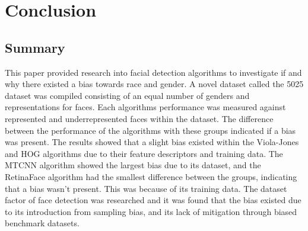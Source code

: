 \documentclass{l4proj}
\begin{document}
\chapter{Conclusion}

\section{Summary}
This paper provided research into facial detection algorithms to investigate if and why there existed a bias towards race and gender. A novel dataset called the 5025 dataset was compiled consisting of an equal number of genders and representations for faces. Each algorithms performance was measured against represented and underrepresented faces within the dataset. The difference between the performance of the algorithms with these groups indicated if a bias was present. The results showed that a slight bias existed within the Viola-Jones and HOG algorithms due to their feature descriptors and training data. The MTCNN algorithm showed the largest bias due to its dataset, and the RetinaFace algorithm had the smallest difference between the groups, indicating that a bias wasn't present. This was because of its training data. The dataset factor of face detection was researched and it was found that the bias existed due to its introduction from sampling bias, and its lack of mitigation through biased benchmark datasets. 

\end{document}

